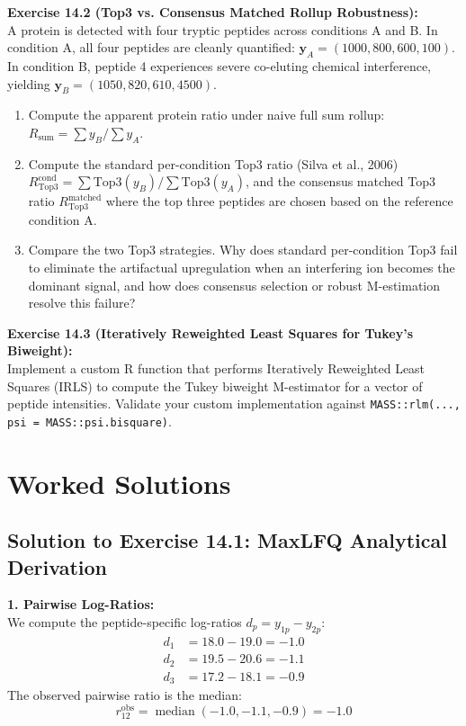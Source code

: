 \documentclass[11pt,oneside]{book}
\begin{document}
\vspace{0.8em}
\noindent\textbf{Exercise 14.2 (Top3 vs. Consensus Matched Rollup Robustness):}\\
A protein is detected with four tryptic peptides across conditions A and B. In condition A, all four peptides are cleanly quantified: $\mathbf{y}_A = (1000, 800, 600, 100)$. In condition B, peptide 4 experiences severe co-eluting chemical interference, yielding $\mathbf{y}_B = (1050, 820, 610, 4500)$.
\begin{enumerate}
    \item Compute the apparent protein ratio under naive full sum rollup: $R_{\text{sum}} = \sum y_B / \sum y_A$.
    \item Compute the standard per-condition Top3 ratio (Silva et al., 2006) $R_{\text{Top3}}^{\text{cond}} = \sum \text{Top3}(y_B) / \sum \text{Top3}(y_A)$, and the consensus matched Top3 ratio $R_{\text{Top3}}^{\text{matched}}$ where the top three peptides are chosen based on the reference condition A.
    \item Compare the two Top3 strategies. Why does standard per-condition Top3 fail to eliminate the artifactual upregulation when an interfering ion becomes the dominant signal, and how does consensus selection or robust M-estimation resolve this failure?
\end{enumerate}

\vspace{0.8em}
\noindent\textbf{Exercise 14.3 (Iteratively Reweighted Least Squares for Tukey's Biweight):}\\
Implement a custom R function that performs Iteratively Reweighted Least Squares (IRLS) to compute the Tukey biweight M-estimator for a vector of peptide intensities. Validate your custom implementation against \texttt{MASS::rlm(..., psi = MASS::psi.bisquare)}.

\section{Worked Solutions}

\subsection*{Solution to Exercise 14.1: MaxLFQ Analytical Derivation}
\textbf{1. Pairwise Log-Ratios:}\\
We compute the peptide-specific log-ratios $d_p = y_{1p} - y_{2p}$:
\begin{align*}
d_1 &= 18.0 - 19.0 = -1.0 \\
d_2 &= 19.5 - 20.6 = -1.1 \\
d_3 &= 17.2 - 18.1 = -0.9
\end{align*}
The observed pairwise ratio is the median:
$$r_{12}^{\text{obs}} = \operatorname{median}(-1.0, -1.1, -0.9) = -1.0$$
\end{document}
